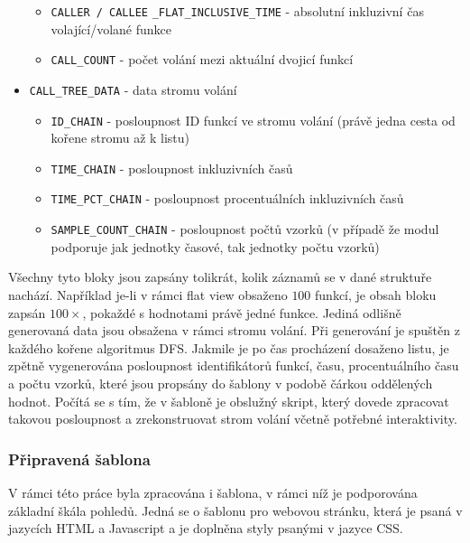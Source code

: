\documentclass[czech,BP]{thesiskiv}
\begin{document}
\begin{itemize}
\begin{itemize}
	\item \texttt{CALLER / CALLEE} \texttt{\_FLAT\_INCLUSIVE\_TIME} - absolutní inkluzivní čas volající/volané funkce
	\item \texttt{CALL\_COUNT} - počet volání mezi aktuální dvojicí funkcí
	\end{itemize}
\item \texttt{CALL\_TREE\_DATA} - data stromu volání
	\begin{itemize}
	\item \texttt{ID\_CHAIN} - posloupnost ID funkcí ve stromu volání (právě jedna cesta od kořene stromu až k listu)
	\item \texttt{TIME\_CHAIN} - posloupnost inkluzivních časů
	\item \texttt{TIME\_PCT\_CHAIN} - posloupnost procentuálních inkluzivních časů
	\item \texttt{SAMPLE\_COUNT\_CHAIN} - posloupnost počtů vzorků (v případě že modul podporuje jak jednotky časové, tak jednotky počtu vzorků)
	\end{itemize}
\end{itemize}

Všechny tyto bloky jsou zapsány tolikrát, kolik záznamů se v dané struktuře nachází. Například je-li v rámci flat view obsaženo $100$ funkcí, je obsah bloku zapsán $100\times$, pokaždé s hodnotami právě jedné funkce. Jediná odlišně generovaná data jsou obsažena v rámci stromu volání. Při generování je spuštěn z každého kořene algoritmus DFS. Jakmile je po čas procházení dosaženo listu, je zpětně vygenerována posloupnost identifikátorů funkcí, času, procentuálního času a počtu vzorků, které jsou propsány do šablony v podobě čárkou oddělených hodnot. Počítá se s tím, že v šabloně je obslužný skript, který dovede zpracovat takovou posloupnost a zrekonstruovat strom volání včetně potřebné interaktivity.

\subsubsection*{Připravená šablona}

V rámci této práce byla zpracována i šablona, v rámci níž je podporována základní škála pohledů. Jedná se o šablonu pro webovou stránku, která je psaná v jazycích HTML a Javascript a je doplněna styly psanými v jazyce CSS.
\end{document}

